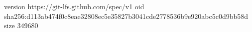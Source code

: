 version https://git-lfs.github.com/spec/v1
oid sha256:d113ab474f0c8eae32808ec5e35827b3041cde2778536b9e920abc5c0d9bb58d
size 349680
